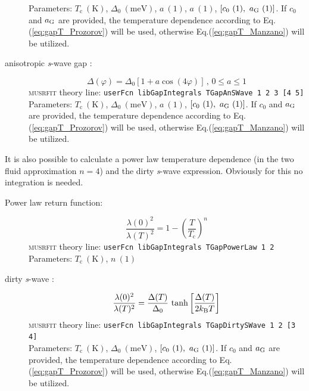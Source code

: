 \documentclass[twoside]{article}
\newcommand{\musrfit}{\textsc{musrfit}\xspace}
\begin{document}
\begin{description}
    Parameters: $T_{\mathrm c}~(\mathrm{K})$, $\Delta_0~(\mathrm{meV})$, $a~(1)$, $a~(1)$, $[c_0~(1),~a_{\rm G}~(1)]$. 
    If $c_0$ and $a_{\rm G}$ are provided, the temperature dependence according to Eq.(\ref{eq:gapT_Prozorov}) will be used, 
    otherwise Eq.(\ref{eq:gapT_Manzano}) will be utilized.
 \item[anisotropic \textit{s}-wave gap \cite{AnisotropicSWave}:] 
    \begin{equation}
      \Delta(\varphi) = \Delta_0\left[1+a\cos\left(4\varphi\right)\right]\,,\,0\leqslant a\leqslant1
    \end{equation}
    \musrfit theory line: \verb?userFcn libGapIntegrals TGapAnSWave 1 2 3 [4 5]?\\[1.5ex]
    Parameters: $T_{\mathrm c}~(\mathrm{K})$, $\Delta_0~(\mathrm{meV})$, $a~(1)$, $[c_0~(1),~a_{\rm G}~(1)]$. 
    If $c_0$ and $a_{\rm G}$ are provided, the temperature dependence according to Eq.(\ref{eq:gapT_Prozorov}) will be used, 
    otherwise Eq.(\ref{eq:gapT_Manzano}) will be utilized.
\end{description}

\noindent It is also possible to calculate a power law temperature dependence (in the two fluid approximation $n=4$) and the dirty \textit{s}-wave expression. 
Obviously for this no integration is needed.
\begin{description}
 \item[Power law return function:] 
   \begin{equation}
     \frac{\lambda(0)^2}{\lambda(T)^2} = 1-\left(\frac{T}{T_{\mathrm c}}\right)^n
   \end{equation}
   \musrfit theory line: \verb?userFcn libGapIntegrals TGapPowerLaw 1 2?\\[1.5ex]
   Parameters: $T_{\mathrm c}~(\mathrm{K})$, $n~(1)$
 \item[dirty \textit{s}-wave \cite{Tinkham}:]
    \begin{equation}
      \frac{\lambda(0)^2}{\lambda(T)^2} = \frac{\Delta(T)}{\Delta_0}\,\tanh\left[\frac{\Delta(T)}{2 k_{\rm B} T}\right]
    \end{equation}
    \musrfit theory line: \verb?userFcn libGapIntegrals TGapDirtySWave 1 2 [3 4]?\\[1.5ex]
    Parameters: $T_{\mathrm c}~(\mathrm{K})$, $\Delta_0~(\mathrm{meV})$, $[c_0~(1),~a_{\rm G}~(1)]$. 
    If $c_0$ and $a_{\rm G}$ are provided, the temperature dependence according to Eq.(\ref{eq:gapT_Prozorov}) will be used, 
    otherwise Eq.(\ref{eq:gapT_Manzano}) will be utilized.
\end{description}
\end{document}
